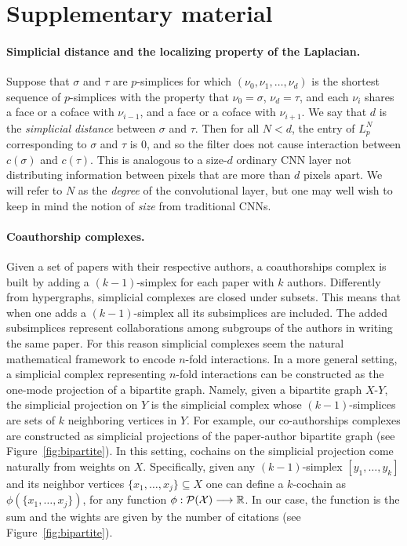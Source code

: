 \section{Supplementary material}\label{sec:supp_material}

\paragraph{Simplicial distance and the localizing property of the Laplacian.}
Suppose that $\sigma$ and $\tau$ are $p$-simplices for which $(\nu_0, \nu_1, \dotsc, \nu_d)$ is the shortest sequence of $p$-simplices with the property that $\nu_0=\sigma$, $\nu_d=\tau$, and each $\nu_i$ shares a face or a coface with $\nu_{i-1}$, and a face or a coface with $\nu_{i+1}$. We say that $d$ is the \emph{simplicial distance} between $\sigma$ and $\tau$. Then for all $N<d$, the entry of $L_p^N$ corresponding to $\sigma$ and $\tau$ is $0$, and so the filter does not cause interaction between $c(\sigma)$ and $c(\tau)$. This is analogous to a size-$d$ ordinary CNN layer not distributing information between pixels that are more than $d$ pixels apart. We will refer to $N$ as the \emph{degree} of the convolutional layer, but one may well wish to keep in mind the notion of \emph{size} from traditional CNNs.

\paragraph{Coauthorship complexes.}
Given a set of papers with their respective authors, a coauthorships complex is built by adding a $(k-1)$-simplex for each paper with $k$ authors. Differently from hypergraphs, simplicial complexes are closed under subsets. This means that when one adds a $(k-1)$-simplex all its subsimplices are included. The added subsimplices represent collaborations among subgroups of the authors in writing the same paper. For this reason simplicial complexes seem the natural mathematical framework to encode $n$-fold interactions. In a more general setting, a simplicial complex representing $n$-fold interactions can be constructed as the one-mode projection of a bipartite graph. Namely, given a bipartite graph $X$-$Y$, the simplicial projection on $Y$ is the simplicial complex whose $(k-1)$-simplices are sets of $k$ neighboring vertices in $Y$. For example, our co-authorships complexes are constructed as simplicial projections of the paper-author bipartite graph (see Figure~\ref{fig:bipartite}). In this setting, cochains on the simplicial projection come naturally from weights on $X$. Specifically, given any $(k-1)$-simplex $[y_1,\dots,y_k]$ and its neighbor vertices $\{x_1,\dots,x_j\}\subseteq X$ one can define a $k$-cochain as $\phi(\{x_1,\dots,x_j\})$, for any function $\phi: \mathcal{P(X)}\longrightarrow \mathbb{R} $. In our case, the function is the sum and the wights are given by the number of citations (see Figure~\ref{fig:bipartite}).


